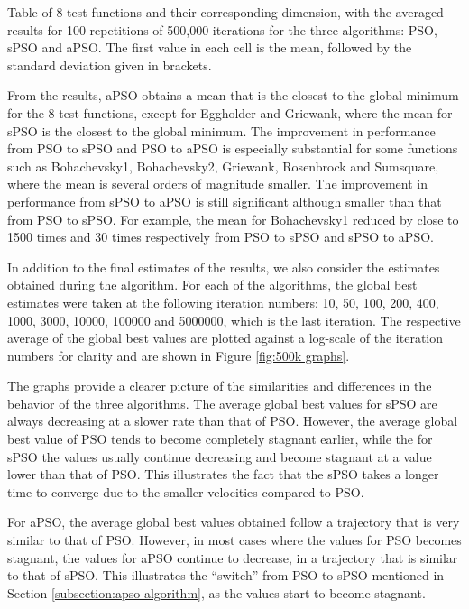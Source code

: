 \documentclass[12pt]{article}
\theoremstyle{definition}
\begin{document}
\begin{table}[H]
    \centering
    \renewcommand{\arraystretch}{0.7}
    
    \renewcommand{\arraystretch}{1}
    \caption{Table of 8 test functions and their corresponding dimension, with the averaged results for 100 repetitions of 500,000 iterations for the three algorithms: PSO, sPSO and aPSO. The first value in each cell is the mean, followed by the standard deviation given in brackets.}
    \label{tab:500k table}
\end{table}

From the results, aPSO obtains a mean that is the closest to the global minimum for the 8 test functions, except for Eggholder and Griewank, where the mean for sPSO is the closest to the global minimum. The improvement in performance from PSO to sPSO and PSO to aPSO is especially substantial for some functions such as Bohachevsky1, Bohachevsky2, Griewank, Rosenbrock and Sumsquare, where the mean is several orders of magnitude smaller. The improvement in performance from sPSO to aPSO is still significant although smaller than that from PSO to sPSO. For example, the mean for Bohachevsky1 reduced by close to 1500 times and 30 times respectively from PSO to sPSO and sPSO to aPSO. \newline

In addition to the final estimates of the results, we also consider the estimates obtained during the algorithm. For each of the algorithms, the global best estimates were taken at the following iteration numbers: 10, 50, 100, 200, 400, 1000, 3000, 10000, 100000 and 5000000, which is the last iteration. The respective average of the global best values are plotted against a log-scale of the iteration numbers for clarity and are shown in Figure \ref{fig:500k graphs}. \newline

The graphs provide a clearer picture of the similarities and differences in the behavior of the three algorithms. The average global best values for sPSO are always decreasing at a slower rate than that of PSO. However, the average global best value of PSO tends to become completely stagnant earlier, while the for sPSO the values usually continue decreasing and become stagnant at a value lower than that of PSO. This illustrates the fact that the sPSO takes a longer time to converge due to the smaller velocities compared to PSO. \newline

For aPSO, the average global best values obtained follow a trajectory that is very similar to that of PSO. However, in most cases where the values for PSO becomes stagnant, the values for aPSO continue to decrease, in a trajectory that is similar to that of sPSO. This illustrates the ``switch'' from PSO to sPSO mentioned in Section \ref{subsection:apso algorithm}, as the values start to become stagnant.
\end{document}
